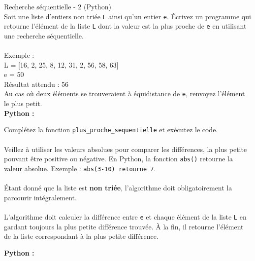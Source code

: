     \begin{Exercice}[10 minutes] Recherche séquentielle - 2 (Python)\\
    
    Soit une liste d’entiers non triée \lstinline{L} ainsi qu’un entier \lstinline{e}. Écrivez un programme qui retourne l'élément de la liste \lstinline{L} dont la valeur est la plus proche de \lstinline{e} en utilisant une recherche séquentielle.\\\\
    Exemple :\\
    L = [16, 2, 25, 8, 12, 31, 2, 56, 58, 63]\\
    e = 50\\
    Résultat attendu : 56\\
    
    Au cas où deux éléments se trouveraient à équidistance de \lstinline{e}, renvoyez l'élément le plus petit.\\
    
    \textbf{Python :}
        
        \begin{conseil}
            Complétez la fonction \lstinline{plus_proche_sequentielle} et exécutez le code.\\\\
            Veillez à utiliser les valeurs absolues pour comparer les différences, la plus petite pouvant être positive ou négative. En Python, la fonction \lstinline{abs()} retourne la valeur absolue. Exemple : \lstinline{abs(3-10) retourne 7}.\\\\
            Étant donné que la liste est \textbf{non triée}, l'algorithme doit obligatoirement la parcourir intégralement.\\\\
            L'algorithme doit calculer la différence entre \lstinline{e} et chaque élément de la liste \lstinline{L} en gardant toujours la plus petite différence trouvée. À la fin, il retourne l'élément de la liste correspondant à la plus petite différence.  
        \end{conseil}
        
        \begin{solution}
        \textbf{Python :}
            
            
        \end{solution}
        
    \end{Exercice}
    
